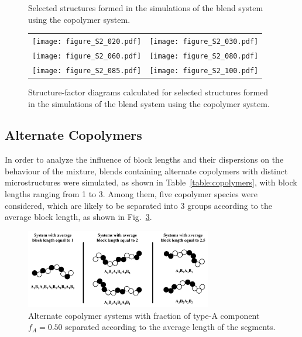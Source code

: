 \documentclass[
journal=mamobx,
manuscript=article,
]{achemso}
\begin{document}
\begin{figure}
\begin{tabular}{C{1.6in}@{}C{1.6in}}
	\end{tabular}
	\caption{Selected structures formed in the simulations of the blend system using the  copolymer system.}
	\label{fig:Figure_4}
\end{figure}

\begin{figure}
	\centering
	\begin{tabular}{C{1.6in}@{}C{1.6in}}
		\texttt{[image: figure\_S2\_020.pdf]} & \texttt{[image: figure\_S2\_030.pdf]} \\
		\texttt{[image: figure\_S2\_060.pdf]} & \texttt{[image: figure\_S2\_080.pdf]} \\		
		\texttt{[image: figure\_S2\_085.pdf]} & \texttt{[image: figure\_S2\_100.pdf]} \\		
	\end{tabular}
	\caption{Structure-factor diagrams calculated for selected structures formed in the simulations of the blend system using the  copolymer system.}
	\label{fig:Figure_5}
\end{figure}

\subsection{Alternate Copolymers}

In order to analyze the  influence of block lengths and their dispersions on the behaviour of the mixture, blends containing alternate copolymers with distinct microstructures were simulated, as shown in Table~\ref{table:copolymers}, with block lengths ranging from 1 to 3.
Among them, five copolymer species were considered, which are likely to be separated into 3 groups according to the average block length, as shown in Fig.~\ref{fig:Figure_6}. 

\begin{figure}
	\centering
	\includegraphics[width=3.2in]{figure6.png}
	\caption{Alternate copolymer systems with fraction of type-A component $f_A=0.50$  separated according to the average length of the segments.}
	\label{fig:Figure_6}
\end{figure}
\end{document}
